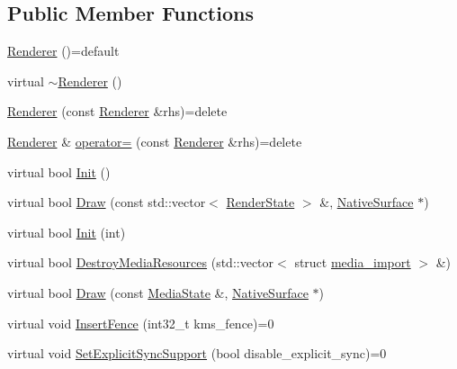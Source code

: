 \subsection*{Public Member Functions}
\begin{DoxyCompactItemize}
\item 
\mbox{\hyperlink{classhwcomposer_1_1Renderer_ae8ad61f25e0091ff5fe70ba4a82a8f25}{Renderer}} ()=default
\item 
virtual \mbox{\hyperlink{classhwcomposer_1_1Renderer_a19b3d949bff31dc2cc1f43b8be9b2d66}{$\sim$\+Renderer}} ()
\item 
\mbox{\hyperlink{classhwcomposer_1_1Renderer_a8ac9dbcdaeaf5f70a47cab428965ca6a}{Renderer}} (const \mbox{\hyperlink{classhwcomposer_1_1Renderer}{Renderer}} \&rhs)=delete
\item 
\mbox{\hyperlink{classhwcomposer_1_1Renderer}{Renderer}} \& \mbox{\hyperlink{classhwcomposer_1_1Renderer_ad3d7968f66d493cf0277a904781bb0f8}{operator=}} (const \mbox{\hyperlink{classhwcomposer_1_1Renderer}{Renderer}} \&rhs)=delete
\item 
virtual bool \mbox{\hyperlink{classhwcomposer_1_1Renderer_aa7f5e7d36857fb67093b9f0cc3a7e606}{Init}} ()
\item 
virtual bool \mbox{\hyperlink{classhwcomposer_1_1Renderer_ab147e6d44d429c0ada5a3212ef7100f1}{Draw}} (const std\+::vector$<$ \mbox{\hyperlink{structhwcomposer_1_1RenderState}{Render\+State}} $>$ \&, \mbox{\hyperlink{classhwcomposer_1_1NativeSurface}{Native\+Surface}} $\ast$)
\item 
virtual bool \mbox{\hyperlink{classhwcomposer_1_1Renderer_a23d289f318b33cdcf998475c2a36aeb2}{Init}} (int)
\item 
virtual bool \mbox{\hyperlink{classhwcomposer_1_1Renderer_a81d8de129d86d71d99366ae59a6fe7f7}{Destroy\+Media\+Resources}} (std\+::vector$<$ struct \mbox{\hyperlink{structhwcomposer_1_1media__import}{media\+\_\+import}} $>$ \&)
\item 
virtual bool \mbox{\hyperlink{classhwcomposer_1_1Renderer_a3811bf639ba6fd9b9891daf0b051b98b}{Draw}} (const \mbox{\hyperlink{structhwcomposer_1_1MediaState}{Media\+State}} \&, \mbox{\hyperlink{classhwcomposer_1_1NativeSurface}{Native\+Surface}} $\ast$)
\item 
virtual void \mbox{\hyperlink{classhwcomposer_1_1Renderer_a0b7be67ed8f89c994cf3bcfd418ef0a4}{Insert\+Fence}} (int32\+\_\+t kms\+\_\+fence)=0
\item 
virtual void \mbox{\hyperlink{classhwcomposer_1_1Renderer_a8f889bf7b26aa7d1436e9ecf6d15e629}{Set\+Explicit\+Sync\+Support}} (bool disable\+\_\+explicit\+\_\+sync)=0
\end{DoxyCompactItemize}


